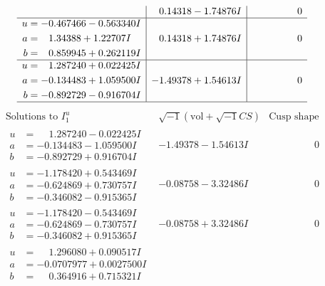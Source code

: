 \documentclass[1p]{elsarticle_modified}
\theoremstyle{definition}
\newcommand{\I}{\sqrt{-1}}
\begin{document}
$$\begin{array}{c|c|c}
 & \phantom{-}0.14318 - 1.74876 I & \phantom{-0.000000 } 0 \\ \hline\begin{aligned}
u &= -0.467466 - 0.563340 I \\
a &= \phantom{-}1.34388 + 1.22707 I \\
b &= \phantom{-}0.859945 + 0.262119 I\end{aligned}
 & \phantom{-}0.14318 + 1.74876 I & \phantom{-0.000000 } 0 \\ \hline\begin{aligned}
u &= \phantom{-}1.287240 + 0.022425 I \\
a &= -0.134483 + 1.059500 I \\
b &= -0.892729 - 0.916704 I\end{aligned}
 & -1.49378 + 1.54613 I & \phantom{-0.000000 } 0\\
 \hline 
 \end{array}$$\newpage$$\begin{array}{c|c|c}  
\text{Solutions to }I^u_{1}& \I (\text{vol} + \sqrt{-1}CS) & \text{Cusp shape}\\
 \hline 
\begin{aligned}
u &= \phantom{-}1.287240 - 0.022425 I \\
a &= -0.134483 - 1.059500 I \\
b &= -0.892729 + 0.916704 I\end{aligned}
 & -1.49378 - 1.54613 I & \phantom{-0.000000 } 0 \\ \hline\begin{aligned}
u &= -1.178420 + 0.543469 I \\
a &= -0.624869 + 0.730757 I \\
b &= -0.346082 - 0.915365 I\end{aligned}
 & -0.08758 - 3.32486 I & \phantom{-0.000000 } 0 \\ \hline\begin{aligned}
u &= -1.178420 - 0.543469 I \\
a &= -0.624869 - 0.730757 I \\
b &= -0.346082 + 0.915365 I\end{aligned}
 & -0.08758 + 3.32486 I & \phantom{-0.000000 } 0 \\ \hline\begin{aligned}
u &= \phantom{-}1.296080 + 0.090517 I \\
a &= -0.0707977 + 0.0027500 I \\
b &= \phantom{-}0.364916 + 0.715321 I\end{aligned}

\end{array}$$
\end{document}
